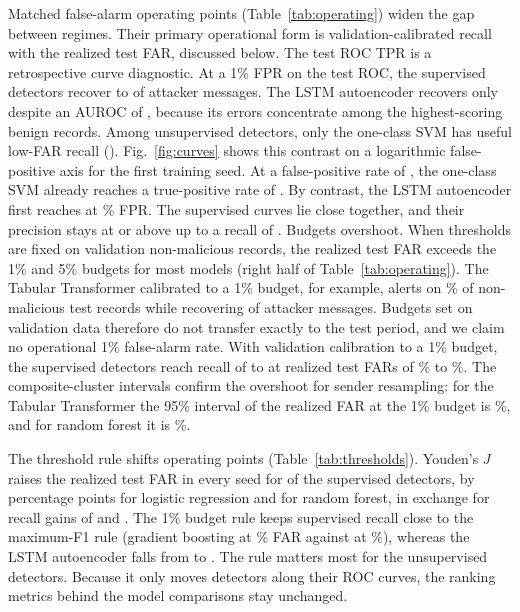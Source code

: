 \documentclass[preprint,12pt,numafflabel]{elsarticle}
\begin{document}
Matched false-alarm operating points (Table~\ref{tab:operating}) widen the gap between regimes. Their primary operational form is validation-calibrated recall with the realized test FAR, discussed below. The test ROC TPR is a retrospective curve diagnostic. At a 1\% FPR on the test ROC, the supervised detectors recover \ResLogRegTPRatOne{} to \ResHGBTPRatOne{} of attacker messages. The LSTM autoencoder recovers only \ResLSTMAETPRatOne{} despite an AUROC of \ResLSTMAEAUROC, because its errors concentrate among the highest-scoring benign records. Among unsupervised detectors, only the one-class SVM has useful low-FAR recall (\ResOneClassSVMTPRatOne). Fig.~\ref{fig:curves} shows this contrast on a logarithmic false-positive axis for the first training seed. At a false-positive rate of \ResCurveFPRPoint, the one-class SVM already reaches a true-positive rate of \ResCurveOCSVMTPR. By contrast, the LSTM autoencoder first reaches \ResCurveTPROnset{} at \ResCurveLSTMAEOnsetFPR\% FPR. The supervised curves lie close together, and their precision stays at or above \ResCurveSupMinPrecision{} up to a recall of \ResCurveRecallPoint. Budgets overshoot. When thresholds are fixed on validation non-malicious records, the realized test FAR exceeds the 1\% and 5\% budgets for most models (right half of Table~\ref{tab:operating}). The Tabular Transformer calibrated to a 1\% budget, for example, alerts on \ResTTCalFAROne\% of non-malicious test records while recovering \ResTTCalRecallOne{} of attacker messages. Budgets set on validation data therefore do not transfer exactly to the test period, and we claim no operational 1\% false-alarm rate. With validation calibration to a 1\% budget, the supervised detectors reach recall of \ResSupCalRecallMin{} to \ResSupCalRecallMax{} at realized test FARs of \ResSupCalFARMin\% to \ResSupCalFARMax\%. The composite-cluster intervals confirm the overshoot for sender resampling: for the Tabular Transformer the 95\% interval of the realized FAR at the 1\% budget is \ResTabTransformerCalFAROneCI\%, and for random forest it is \ResRandomForestCalFAROneCI\%.

The threshold rule shifts operating points (Table~\ref{tab:thresholds}). Youden's $J$ raises the realized test FAR in every seed for \ResThrYoudenFARUpAllSeedsSup{} of the \ResThrSupCount{} supervised detectors, by \ResThrYoudenDeltaLogRegFAR{} percentage points for logistic regression and \ResThrYoudenDeltaRandomForestFAR{} for random forest, in exchange for recall gains of \ResThrYoudenDeltaLogRegRecall{} and \ResThrYoudenDeltaRandomForestRecall. The 1\% budget rule keeps supervised recall close to the maximum-F1 rule (gradient boosting \ResThrBudgetOneHGBRecall{} at \ResThrBudgetOneHGBFAR\% FAR against \ResThrMaxFHGBRecall{} at \ResThrMaxFHGBFAR\%), whereas the LSTM autoencoder falls from \ResThrMaxFLSTMAERecall{} to \ResThrBudgetOneLSTMAERecall. The rule matters most for the unsupervised detectors. Because it only moves detectors along their ROC curves, the ranking metrics behind the model comparisons stay unchanged.
\end{document}
